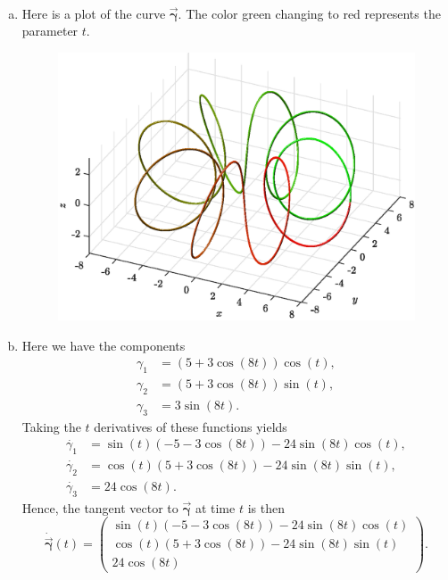 \documentclass[12pt]{article} %
\newcommand{\curvegamma}{\boldsymbol{\vec{\gamma}}}
\newcommand{\tangentgamma}{\boldsymbol{\dot{\vec{\gamma}}}}
\begin{document}
\begin{solution}~
\begin{enumerate}[(a)]
    \item Here is a plot of the curve $\curvegamma$. The color green changing to red represents the parameter $t$.
    \begin{figure}[H]
        \centering
        \includegraphics[width=.8\textwidth]{figures/1a}
    \end{figure}

    \item Here we have the components 
    \begin{align*}
    \gamma_1 &= (5+3\cos(8t))\cos(t),\\
    \gamma_2 &= (5+3\cos(8t))\sin(t),\\
    \gamma_3 &= 3\sin(8t).
    \end{align*}
    Taking the $t$ derivatives of these functions yields
    \begin{align*}
    \dot{\gamma_1} &= \sin(t)(-5-3\cos(8t))-24\sin(8t)\cos(t),\\
    \dot{\gamma_2} &= \cos(t)(5+3\cos(8t))-24\sin(8t)\sin(t),\\
    \dot{\gamma_3} &= 24 \cos(8t).
    \end{align*}
   Hence, the tangent vector to $\curvegamma$ at time $t$ is then
    \[
    \tangentgamma(t) = \begin{pmatrix}  \sin(t)(-5-3\cos(8t))-24\sin(8t)\cos(t) \\
                        \cos(t)(5+3\cos(8t))-24\sin(8t)\sin(t) \\
                        24 \cos(8t) \end{pmatrix}.
    \]


\end{enumerate}
\end{solution}
\end{document}
